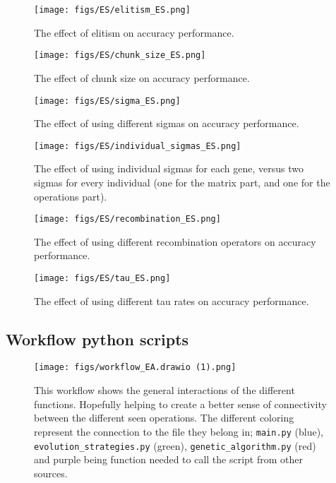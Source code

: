 \documentclass{article}
\begin{document}
\begin{figure*}[htbp]
    \centering
    \texttt{[image: figs/ES/elitism\_ES.png]}
    \caption{The effect of elitism on accuracy performance.}
    \label{fig:A_ES_elitism}
\end{figure*}

\newpage

\begin{figure*}[htbp]
    \centering
    \texttt{[image: figs/ES/chunk\_size\_ES.png]}
    \caption{The effect of chunk size on accuracy performance.}
    \label{fig:A_ES_chunksize}
\end{figure*}

\begin{figure*}[htbp]
    \centering
    \texttt{[image: figs/ES/sigma\_ES.png]}
    \caption{The effect of using different sigmas on accuracy performance.}
    \label{fig:A_ES_sigmas}
\end{figure*}

\begin{figure*}[htbp]
    \centering
    \texttt{[image: figs/ES/individual\_sigmas\_ES.png]}
    \captionsetup{width=0.7\textwidth}
    \caption{
    The effect of using individual sigmas for each gene, versus two sigmas for every individual (one for the matrix part, and one for the operations part).
    }
    \label{fig:A_ES_indivsigma}
\end{figure*}

\newpage

\begin{figure*}[htbp]
    \centering
    \texttt{[image: figs/ES/recombination\_ES.png]}
    \caption{The effect of using different recombination operators on accuracy performance.}
    \label{fig:A_ES_recombination}
\end{figure*}

\newpage

\begin{figure*}[htbp]
    \centering
    \texttt{[image: figs/ES/tau\_ES.png]}
    \caption{The effect of using different tau rates on accuracy performance.}
    \label{fig:A_ES_tau}
\end{figure*}

\newpage

\subsection{Workflow python scripts}
\label{app:workflow}

\begin{figure}[htbp]
    \centering
    \texttt{[image: figs/workflow\_EA.drawio (1).png]}
    \caption{ 
        This workflow shows the general interactions of the different functions. 
        Hopefully helping to create a better sense of connectivity between the different seen operations. 
        The different coloring represent the connection to the file they belong in; 
        \texttt{main.py} (blue), \texttt{evolution\_strategies.py} (green), \texttt{genetic\_algorithm.py} (red) and purple being function needed to call the script from other sources.
    }
    \label{fig:A_workflow}
\end{figure}
\end{document}
